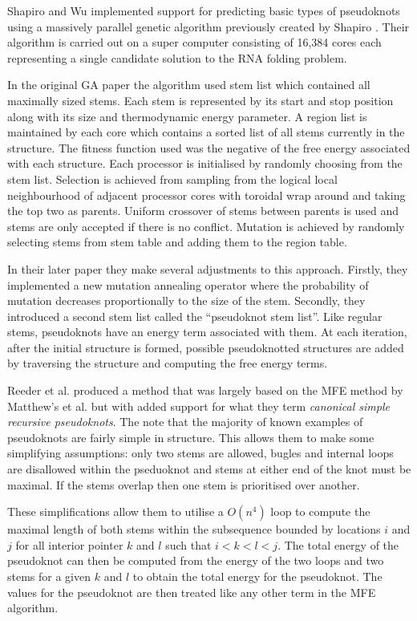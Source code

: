 \documentclass[journal]{IEEEtran}
\begin{document}
Shapiro and Wu \cite{shapiro1997predicting} implemented support for predicting basic types of pseudoknots using a massively parallel genetic algorithm previously created by Shapiro \cite{shapiro1994massively}. Their algorithm is carried out on a super computer consisting of 16,384 cores each representing a single candidate solution to the RNA folding problem.

In the original GA paper \cite{shapiro1994massively} the algorithm used stem list which contained all maximally sized stems. Each stem is represented by its start and stop position along with its size and thermodynamic energy parameter. A region list is maintained by each core which contains a sorted list of all stems currently in the structure. The fitness function used was the negative of the free energy associated with each structure. Each processor is initialised by randomly choosing from the stem list. Selection is achieved from sampling from the logical local neighbourhood of adjacent processor cores with toroidal wrap around and taking the top two as parents. Uniform crossover of stems between parents is used and stems are only accepted if there is no conflict. Mutation is achieved by randomly selecting stems from stem table and adding them to the region table.

In their later paper \cite{shapiro1997predicting} they make several adjustments to this approach. Firstly, they implemented a new mutation annealing operator where the probability of mutation decreases proportionally to the size of the stem. Secondly, they introduced a second stem list called the ``pseudoknot stem list''. Like regular stems, pseudoknots have an energy term associated with them. At each iteration, after the initial structure is formed, possible pseudoknotted structures are added by traversing the structure and computing the free energy terms.

Reeder et al. \cite{reeder2007pknotsrg} produced a method that was largely based on the MFE method by Matthew's et al. \cite{mathews1999expanded} but with added support for what they term \textit{canonical simple recursive pseudoknots}. The note that the majority of known examples of pseudoknots are fairly simple in structure. This allows them to make some simplifying assumptions: only two stems are allowed, bugles and internal loops are disallowed within the pseduoknot and stems at either end of the knot must be maximal. If the stems overlap then one stem is prioritised over another. 

These simplifications allow them to utilise a $O(n^4)$ loop to compute the maximal length of both stems within the subsequence bounded by locations $i$ and $j$ for all interior pointer $k$ and $l$ such that $i < k < l < j$. The total energy of the pseudoknot can then be computed from the energy of the two loops and two stems for a given $k$ and $l$ to obtain the total energy for the pseudoknot. The values for the pseudoknot are then treated like any other term in the MFE algorithm.
\end{document}
